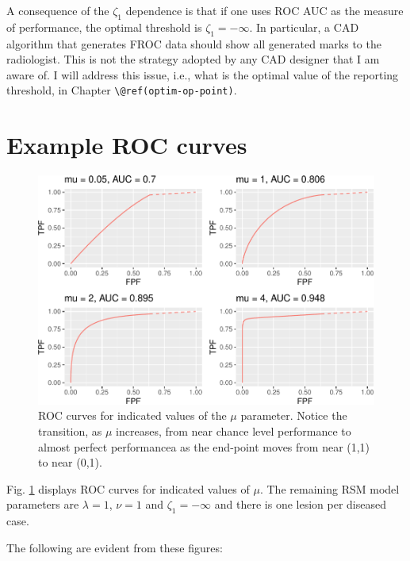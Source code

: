 \documentclass[
]{book}
\begin{document}
A consequence of the \(\zeta_1\) dependence is that if one uses ROC AUC as the measure of performance, the optimal threshold is \(\zeta_1 = -\infty\). In particular, a CAD algorithm that generates FROC data should show all generated marks to the radiologist. This is not the strategy adopted by any CAD designer that I am aware of. I will address this issue, i.e., what is the optimal value of the reporting threshold, in Chapter \texttt{\textbackslash{}@ref(optim-op-point)}.

\hypertarget{rsm-pred-roc-curves}{%
\section{Example ROC curves}\label{rsm-pred-roc-curves}}

\begin{figure}
\centering
\includegraphics{07-rsm-predictions_files/figure-latex/rsm-pred-fig-auc-mu-plots-1.pdf}
\caption{\label{fig:rsm-pred-fig-auc-mu-plots}ROC curves for indicated values of the \(\mu\) parameter. Notice the transition, as \(\mu\) increases, from near chance level performance to almost perfect performancea as the end-point moves from near (1,1) to near (0,1).}
\end{figure}

Fig. \ref{fig:rsm-pred-fig-auc-mu-plots} displays ROC curves for indicated values of \(\mu\). The remaining RSM model parameters are \(\lambda = 1\), \(\nu = 1\) and \(\zeta_1 = -\infty\) and there is one lesion per diseased case.

The following are evident from these figures:
\end{document}
